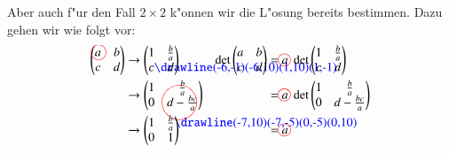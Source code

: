 Aber auch f"ur den Fall $2\times 2$ k"onnen wir die L"osung
bereits bestimmen.
Dazu gehen wir wie folgt vor:
\begin{align*}
\begin{pmatrix}
a%
\begin{picture}(0,0)
\color{red}\put(-2,3){\circle{12}}
\end{picture}%
&b\\
c&d%
\end{pmatrix}
&\rightarrow
\begin{pmatrix}1&\frac{b}{a}\\
c%
\begin{picture}(0,0)
\color{blue}\drawline(-6,-1)(-6,10)(1,10)(1,-1)
\end{picture}%
&d\end{pmatrix}
&\det \begin{pmatrix}a&b\\c&d\end{pmatrix}
&=a%
\begin{picture}(0,0)
\color{red}\put(-3,3){\circle{10}}
\end{picture}%
\;
\det
\begin{pmatrix}1&\frac{b}{a}\\c&d\end{pmatrix}
\\
&\rightarrow
\begin{pmatrix}1&\frac{b}{a}\\0&d-\frac{bc}{a}%
\begin{picture}(0,0)
\color{red}\put(-15,3){\circle{28}}
\end{picture}%
\end{pmatrix}
&
&=a%
\begin{picture}(0,0)
\color{red}\put(-3,3){\circle{10}}
\end{picture}%
\;\det\begin{pmatrix}1&\frac{b}{a}\\0&d-\frac{bc}{a}\end{pmatrix}
\\
&\rightarrow
\begin{pmatrix}1&\frac{b}{a}%
\begin{picture}(0,0)
\color{blue}\drawline(-7,10)(-7,-5)(0,-5)(0,10)
\end{picture}%
\\0&1\end{pmatrix}
&
&=a%
\begin{picture}(0,0)
\color{red}\put(-3,3){\circle{10}}
\end{picture}%

\end{align*}
